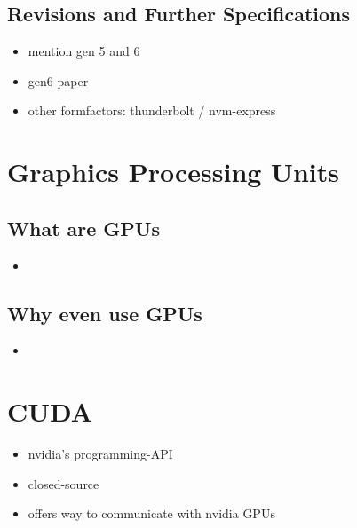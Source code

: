 \subsection{Revisions and Further Specifications}

\begin{itemize}
\item mention gen 5 and 6
\item gen6 paper
\item other formfactors: thunderbolt / nvm-express
\end{itemize}

\section{Graphics Processing Units}


\subsection{What are GPUs}

\begin{itemize}
\item
\end{itemize}


\subsection{Why even use GPUs}

\begin{itemize}
\item
\end{itemize}


\section{CUDA}
\begin{itemize}
\item nvidia's programming-API
\item closed-source
\item offers way to communicate with nvidia GPUs
\end{itemize}


